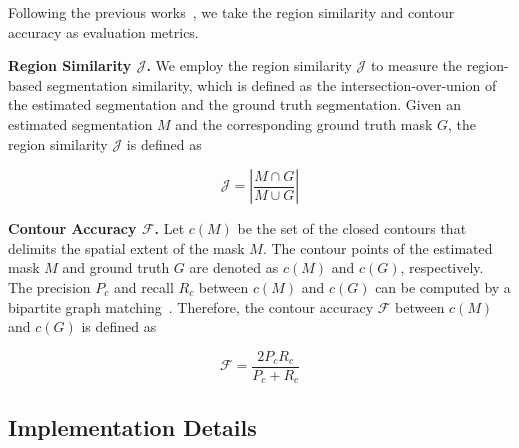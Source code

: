 \documentclass[final]{cvpr}
\begin{document}
Following the previous works~\cite{DBLP:conf/iccv/OhLXK19,DBLP:conf/eccv/YangWY20}, we take the region similarity and contour accuracy as evaluation metrics.

\noindent \textbf{Region Similarity $\mathcal{J}$.}
We employ the region similarity $\mathcal{J}$ to measure the region-based segmentation similarity,
which is defined as the intersection-over-union of the estimated segmentation and the ground truth segmentation.
Given an estimated segmentation $M$ and the corresponding ground truth mask $G$, the region similarity $\mathcal{J}$ is defined as

\begin{equation}
  \mathcal{J} = \left|\frac{M \cap G}{M \cup G}\right|
\end{equation}

\noindent \textbf{Contour Accuracy $\mathcal{F}$.}
Let $c(M)$ be the set of the closed contours that delimits the spatial extent of the mask $M$.
The contour points of the estimated mask $M$ and ground truth $G$ are denoted as $c(M)$ and $c(G)$, respectively.
The precision $P_c$ and recall $R_c$ between $c(M)$ and $c(G)$ can be computed by a bipartite graph matching~\cite{DBLP:journals/pami/MartinFM04}.
Therefore, the contour accuracy $\mathcal{F}$ between $c(M)$ and $c(G)$ is defined as

\begin{equation}
  \mathcal{F} = \frac{2 P_c R_c}{P_c + R_c}
\end{equation}

\subsection{Implementation Details}
\end{document}
